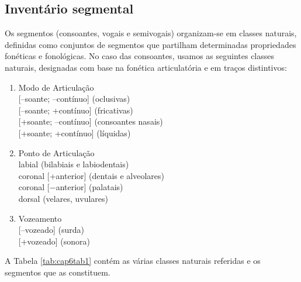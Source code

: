 \documentclass[output=paper,colorlinks,citecolor=brown,booklanguage=portuguese]{langscibook}
\begin{document}
\subsection{Inventário segmental}
Os segmentos (consoantes, vogais e semivogais) organizam-se em classes naturais, definidas como conjuntos de segmentos que partilham determinadas propriedades fonéticas e fonológicas. No caso das consoantes, usamos as seguintes classes naturais, designadas com base na fonética articulatória e em traços distintivos:


\begin{enumerate}[label=(\roman*)]
 \item Modo de Articulação\\
    {[$–$soante; $–$contínuo]} (oclusivas)\\
    {[$–$soante; +contínuo]} (fricativas)\\
    {[+soante; $–$contínuo]} (consoantes nasais)\\ 
    {[+soante; +contínuo]} (líquidas)
\item  Ponto de Articulação\\
    labial (bilabiais e labiodentais)\\ 
    coronal [+anterior] (dentais e alveolares)\\
    coronal [$-$anterior] (palatais)\\
    dorsal (velares, uvulares)
\item Vozeamento\\
 {[$–$vozeado]} (surda)\\
 {[+vozeado]} (sonora)\\
\end{enumerate}

A Tabela \ref{tab:cap6tab1} contém as várias classes naturais referidas e os segmentos que as constituem.
\end{document}
